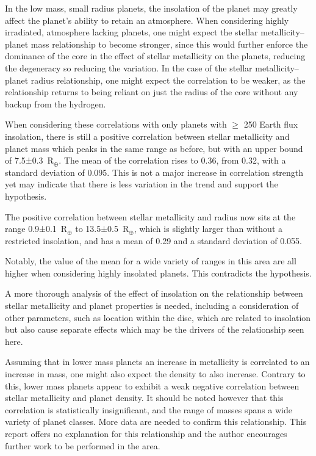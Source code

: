 \documentclass[a4paper,twocolumn,12pt]{article}
\begin{document}
In the low mass, small radius planets, the insolation of the planet may greatly affect the planet's ability to retain an atmosphere. When considering highly irradiated, atmosphere lacking planets, one might expect the stellar metallicity--planet mass relationship to become stronger, since this would further enforce the dominance of the core in the effect of stellar metallicity on the planets, reducing the degeneracy so reducing the variation. In the case of the stellar metallicity--planet radius relationship, one might expect the correlation to be weaker, as the relationship returns to being reliant on just the radius of the core without any backup from the hydrogen.

When considering these correlations with only planets with $\geq$ 250 Earth flux insolation, there is still a positive correlation between stellar metallicity and planet mass which peaks in the same range as before, but with an upper bound of 7.5±0.3~R$_\oplus$. The mean of the correlation rises to 0.36, from 0.32, with a standard deviation of 0.095. This is not a major increase in correlation strength yet may indicate that there is less variation in the trend and support the hypothesis.

The positive correlation between stellar metallicity and radius now sits at the range 0.9±0.1~R$_\oplus$ to 13.5±0.5~R$_\oplus$, which is slightly larger than without a restricted insolation, and has a mean of 0.29 and a standard deviation of 0.055.

Notably, the value of the mean for a wide variety of ranges in this area are all higher when considering highly insolated planets. This contradicts the hypothesis.

A more thorough analysis of the effect of insolation on the relationship between stellar metallicity and planet properties is needed, including a consideration of other parameters, such as location within the disc, which are related to insolation but also cause separate effects which may be the drivers of the relationship seen here.

Assuming that in lower mass planets an increase in metallicity is correlated to an increase in mass, one might also expect the density to also increase. Contrary to this, lower mass planets appear to exhibit a weak negative correlation between stellar metallicity and planet density. It should be noted however that this correlation is statistically insignificant, and the range of masses spans a wide variety of planet classes. More data are needed to confirm this relationship. This report offers no explanation for this relationship and the author encourages further work to be performed in the area.
\end{document}
